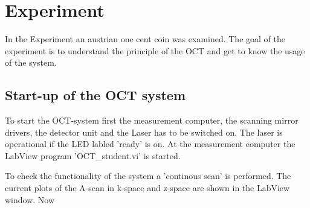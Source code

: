 \chapter{Experiment}

In the Experiment an austrian one cent coin was examined. The goal of the experiment is to understand the principle of the OCT and get to know the usage of the system.

\section{Start-up of the OCT system}

To start the OCT-system first the measurement computer, the scanning mirror drivers, the detector unit and the Laser has to be switched on. The laser is operational if the LED labled 'ready' is on. At the measurement computer the LabView program 'OCT\_student.vi' is started.

To check the functionality of the system a 'continous scan' is performed. The current plots of the A-scan in k-space and z-space are shown in the LabView window. Now 